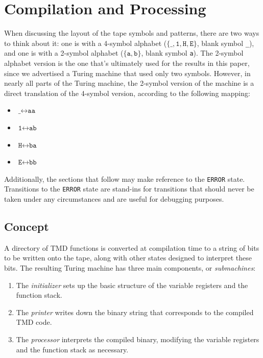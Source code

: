 \documentclass[11pt]{article}
\begin{document}
\section{Compilation and Processing}

When discussing the layout of the tape symbols and patterns, there are two ways to think about it: one is with a 4-symbol alphabet ($\{\texttt{\_}, \texttt{1}, \texttt{H}, \texttt{E}\}$, blank symbol \texttt{\_}), and one is with a 2-symbol alphabet ($\{\texttt{a}, \texttt{b}\}$, blank symbol \texttt{a}). The 2-symbol alphabet version is the one that's ultimately used for the results in this paper, since we advertised a Turing machine that used only two symbols. However, in nearly all parts of the Turing machine, the 2-symbol version of the machine is a direct translation of the 4-symbol version, according to the following mapping:

\begin{itemize}
\item $\texttt{\_} \leftrightarrow \texttt{aa}$
\item $\texttt{1} \leftrightarrow \texttt{ab}$
\item $\texttt{H} \leftrightarrow \texttt{ba}$
\item $\texttt{E} \leftrightarrow \texttt{bb}$
\end{itemize}

Additionally, the sections that follow may make reference to the \texttt{ERROR} state. Transitions to the \texttt{ERROR} state are stand-ins for transitions that should never be taken under any circumstances and are useful for debugging purposes.

\subsection{Concept} \label{sec:ontape}

A directory of TMD functions is converted at compilation time to a string of bits to be written onto the tape, along with other states designed to interpret these bits. The resulting Turing machine has three main components, or \emph{submachines}:

\begin{enumerate}
\item The \emph{initializer} sets up the basic structure of the variable registers and the function stack.
\item The \emph{printer} writes down the binary string that corresponds to the compiled TMD code.
\item The \emph{processor} interprets the compiled binary, modifying the variable registers and the function stack as necessary.
\end{enumerate}
\end{document}
